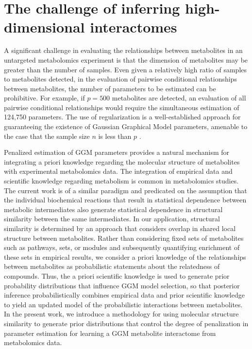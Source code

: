 \section{The challenge of inferring high-dimensional interactomes}
A significant challenge in evaluating the relationships between metabolites in an untargeted metabolomics experiment is that the dimension of metabolites may be greater than the number of samples. Even given a relatively high ratio of samples to metabolites detected, in the evaluation of pairwise conditional relationships between metabolites, the number of parameters to be estimated can be prohibitive. For example, if $p=500$ metabolites are detected, an evaluation of all pairwise conditional relationships would require the simultaneous estimation of 124,750 parameters. The use of regularization is a well-established approach for guaranteeing the existence of Gaussian Graphical Model parameters, amenable to the case that the sample size $n$ is less than $p$ \cite{banerjee2008,fan2009,friedman2007,meinshausen2006, yuan2007}.

Penalized estimation of GGM parameters provides a natural mechanism for integrating a priori knowledge regarding the molecular structure of metabolites with experimental metabolomics data. The integration of empirical data and scientific knowledge regarding metabolism is common in metabolomics studies. The current work is of a similar paradigm and predicated on the assumption that the individual biochemical reactions that result in statistical dependence between metabolic intermediates also generate statistical dependence in structural similarity between the same intermediates. In our application, structural similarity is determined by an approach that considers overlap in shared local structure between metabolites. Rather than considering fixed sets of metabolites such as pathways, sets, or modules and subsequently quantifying enrichment of these sets in empirical results, we consider a priori knowledge of the relationships between metabolites as probabilistic statements about the relatedness of compounds. Thus, the a priori scientific knowledge is used to generate prior probability distributions that influence GGM model selection, so that posterior inference probabilistically combines empirical data and prior scientific knowledge to yield an updated model of the probabilistic interactions between metabolites. In the present work, we introduce a methodology for using molecular structure similarity to generate prior distributions that control the degree of penalization in parameter estimation for learning a GGM metabolite interactome from metabolomics data. 
